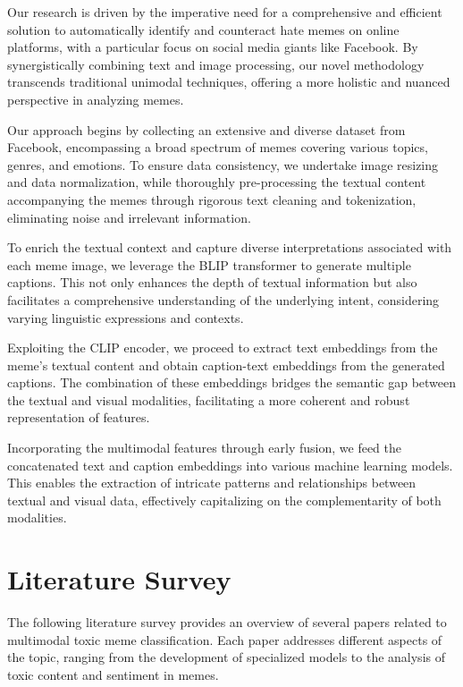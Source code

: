 \documentclass{ieeeaccess}
\begin{document}
Our research is driven by the imperative need for a comprehensive and efficient solution to automatically identify and counteract hate memes on online platforms, with a particular focus on social media giants like Facebook. By synergistically combining text and image processing, our novel methodology transcends traditional unimodal techniques, offering a more holistic and nuanced perspective in analyzing memes.

Our approach begins by collecting an extensive and diverse dataset from Facebook, encompassing a broad spectrum of memes covering various topics, genres, and emotions. To ensure data consistency, we undertake image resizing and data normalization, while thoroughly pre-processing the textual content accompanying the memes through rigorous text cleaning and tokenization, eliminating noise and irrelevant information.

To enrich the textual context and capture diverse interpretations associated with each meme image, we leverage the BLIP transformer to generate multiple captions. This not only enhances the depth of textual information but also facilitates a comprehensive understanding of the underlying intent, considering varying linguistic expressions and contexts.

Exploiting the CLIP encoder, we proceed to extract text embeddings from the meme's textual content and obtain caption-text embeddings from the generated captions. The combination of these embeddings bridges the semantic gap between the textual and visual modalities, facilitating a more coherent and robust representation of features.

Incorporating the multimodal features through early fusion, we feed the concatenated text and caption embeddings into various machine learning models. This enables the extraction of intricate patterns and relationships between textual and visual data, effectively capitalizing on the complementarity of both modalities.

\section{Literature Survey}
\label{sec:literature}

The following literature survey provides an overview of several papers related to multimodal toxic meme classification. Each paper addresses different aspects of the topic, ranging from the development of specialized models to the analysis of toxic content and sentiment in memes.
\end{document}
